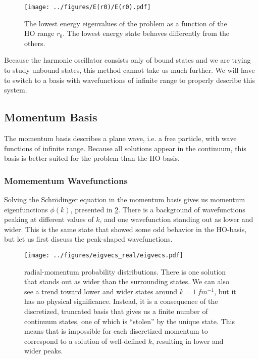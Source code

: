 \documentclass[../main/report.tex]{subfiles}
\begin{document}

\begin{figure}[h]
  \centering
 	\texttt{[image: ../figures/E(r0)/E(r0).pdf]}
  \caption{The lowest energy eigenvalues of the  problem as a function of the HO range $r_0$. The lowest energy state behaves differently from the others.}
  \label{fig:energies(r0)}
\end{figure}



Because the harmonic oscillator consists only of bound states and we are trying to study unbound states, this method cannot take us much further.
We will have to switch to a basis with wavefunctions of infinite range to properly describe this system.

\subsection{Momentum Basis}
\label{sub:momentum_basis}

The momentum basis describes a plane wave, i.e. a free particle, with wave functions of infinite range.
Because all  solutions appear in the continuum, this basis is better suited for the problem than the HO basis.

\subsubsection{Momementum Wavefunctions}

Solving the Schrödinger equation in the momentum basis gives us momentum eigenfunctions $\phi(k)$, presented in \cref{fig:real_momentum_wavefunctions}.
There is a background of wavefunctions peaking at different values of $k$, and one wavefunction standing out as lower and wider.
This is the same state that showed some odd behavior in the HO-basis, but let us first discuss the peak-shaped wavefunctions.


\begin{figure}[hb]
  \centering
  	\texttt{[image: ../figures/eigvecs\_real/eigvecs.pdf]}
  \caption{ radial-momentum probability distributions. There is one solution that stands out as wider than the surrounding states. We can also see a trend toward lower and wider states around $k = \SI{1}{fm^{-1}}$, but it has no physical significance. 
  Instead, it is a consequence of the discretized, truncated basis that gives us a finite number of continuum states, one of which is ``stolen'' by the unique state.
  This means that is impossible for each discretized momentum to correspond to a solution of well-defined $k$, resulting in lower and wider peaks.
  }
  \label{fig:real_momentum_wavefunctions}
\end{figure}
\end{document}
